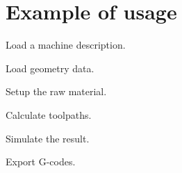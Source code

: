 \chapter{Example of usage}

Load a machine description.


Load geometry data.


Setup the raw material.


Calculate toolpaths.


Simulate the result.


Export G-codes.

